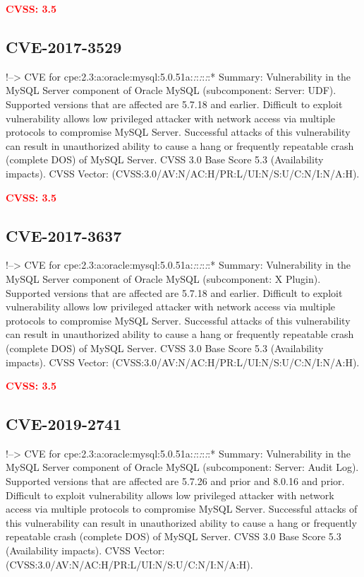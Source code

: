 \documentclass[a4paper, 12pt]{article}
\begin{document}
\textbf{\textcolor{red}{CVSS: 3.5}}

\hypertarget{cve-2017-3529}{%
\subsection{CVE-2017-3529}\label{cve-2017-3529}}

!--\textgreater{} CVE for
cpe:2.3:a:oracle:mysql:5.0.51a:\emph{:}:\emph{:}:\emph{:}:* Summary:
Vulnerability in the MySQL Server component of Oracle MySQL
(subcomponent: Server: UDF). Supported versions that are affected are
5.7.18 and earlier. Difficult to exploit vulnerability allows low
privileged attacker with network access via multiple protocols to
compromise MySQL Server. Successful attacks of this vulnerability can
result in unauthorized ability to cause a hang or frequently repeatable
crash (complete DOS) of MySQL Server. CVSS 3.0 Base Score 5.3
(Availability impacts). CVSS Vector:
(CVSS:3.0/AV:N/AC:H/PR:L/UI:N/S:U/C:N/I:N/A:H).

\textbf{\textcolor{red}{CVSS: 3.5}}

\hypertarget{cve-2017-3637}{%
\subsection{CVE-2017-3637}\label{cve-2017-3637}}

!--\textgreater{} CVE for
cpe:2.3:a:oracle:mysql:5.0.51a:\emph{:}:\emph{:}:\emph{:}:* Summary:
Vulnerability in the MySQL Server component of Oracle MySQL
(subcomponent: X Plugin). Supported versions that are affected are
5.7.18 and earlier. Difficult to exploit vulnerability allows low
privileged attacker with network access via multiple protocols to
compromise MySQL Server. Successful attacks of this vulnerability can
result in unauthorized ability to cause a hang or frequently repeatable
crash (complete DOS) of MySQL Server. CVSS 3.0 Base Score 5.3
(Availability impacts). CVSS Vector:
(CVSS:3.0/AV:N/AC:H/PR:L/UI:N/S:U/C:N/I:N/A:H).

\textbf{\textcolor{red}{CVSS: 3.5}}

\hypertarget{cve-2019-2741}{%
\subsection{CVE-2019-2741}\label{cve-2019-2741}}

!--\textgreater{} CVE for
cpe:2.3:a:oracle:mysql:5.0.51a:\emph{:}:\emph{:}:\emph{:}:* Summary:
Vulnerability in the MySQL Server component of Oracle MySQL
(subcomponent: Server: Audit Log). Supported versions that are affected
are 5.7.26 and prior and 8.0.16 and prior. Difficult to exploit
vulnerability allows low privileged attacker with network access via
multiple protocols to compromise MySQL Server. Successful attacks of
this vulnerability can result in unauthorized ability to cause a hang or
frequently repeatable crash (complete DOS) of MySQL Server. CVSS 3.0
Base Score 5.3 (Availability impacts). CVSS Vector:
(CVSS:3.0/AV:N/AC:H/PR:L/UI:N/S:U/C:N/I:N/A:H).
\end{document}
